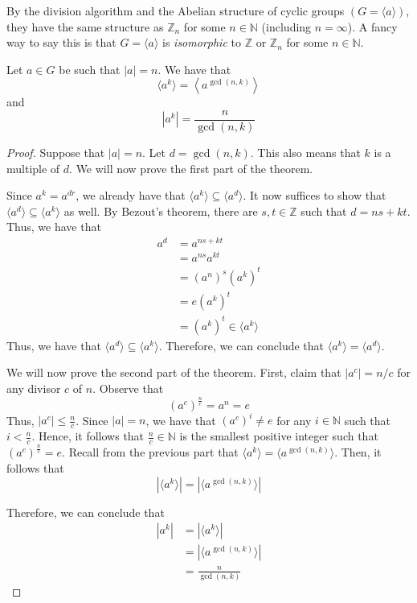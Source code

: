 \begin{remark}
    By the division algorithm and the Abelian structure of cyclic groups \((G = \langle a \rangle)\), they have the same structure as \(\mathbb{Z}_n\) for some \(n \in \mathbb{N}\) (including \(n = \infty\)). A fancy way to say this is that \(G = \langle a \rangle\) is \textit{isomorphic} to \(\mathbb{Z}\) or \(\mathbb{Z}_n\) for some \(n \in \mathbb{N}\).
\end{remark}

\begin{theorem}\label{thm:four-two}
    Let \(a \in G\) be such that \(|a| = n\). We have that
    \[
        \langle a^k \rangle = \left\langle a^{\gcd(n, k)} \right\rangle
    \]
    and
    \[
        \left|a^k\right| = \frac{n}{\gcd(n, k)}
    \]
\end{theorem}

\begin{proof}
    Suppose that \(|a| = n\). Let \(d = \gcd(n, k)\). This also means that \(k\) is a multiple of \(d\). We will now prove the first part of the theorem.

    Since \(a^k = a^{dr}\), we already have that \(\langle a^k \rangle \subseteq \langle a^d \rangle\). It now suffices to show that \(\langle a^d \rangle \subseteq \langle a^k \rangle\) as well. By Bezout's theorem, there are \(s, t \in \mathbb{Z}\) such that \(d = ns + kt\). Thus, we have that 
    \[
    \begin{aligned}
        a^d &= a^{ns + kt} \\
            &= a^{ns} a^{kt} \\
            &= (a^n)^s (a^k)^t \\
            &= e(a^k)^t \\
            &= (a^k)^t \in \langle a^k \rangle
    \end{aligned}
    \]
    Thus, we have that \(\langle a^d \rangle \subseteq \langle a^k \rangle\). Therefore, we can conclude that \(\langle a^k \rangle = \langle a^d \rangle\).

    We will now prove the second part of the theorem. First, claim that \(\left|a^c\right| = n/c\) for any divisor \(c\) of \(n\). Observe that
    \[
        (a^c)^{\frac{n}{c}} = a^n = e
    \]
    Thus, \(\left|a^c\right| \leq \frac{n}{c}\). Since \(|a| = n\), we have that \((a^c)^i \neq e\) for any \(i \in \mathbb{N}\) such that \(i < \frac{n}{c}\). Hence, it follows that \(\frac{n}{c} \in \mathbb{N}\) is the smallest positive integer such that \((a^c)^\frac{n}{c} = e\). Recall from the previous part that \(\langle a^k \rangle = \langle a^{\gcd(n, k)} \rangle\). Then, it follows that
    \[
        \left|\langle a^k \rangle\right| = \left|\langle a^{\gcd(n, k)} \rangle\right|
    \]

    Therefore, we can conclude that
    \[
    \begin{aligned}
        \left|a^k\right| &= \left|\langle a^k \rangle\right| \\
                         &= \left|\langle a^{\gcd(n, k)} \rangle\right| \\
                         &= \frac{n}{\gcd(n, k)}
    \end{aligned}
    \]
\end{proof}

